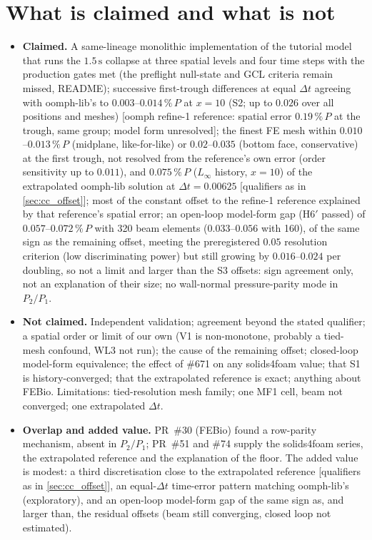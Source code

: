 \documentclass[sn-mathphys,Numbered]{sn-jnl}
\newcommand{\urefOne}{{\small[oomph refine-1 reference: spatial error $0.19\,\%\,P$ at the trough, same group; model form unresolved]}}
\newcommand{\uref}{{\small[qualifiers as in \ref{sec:cc_offset}]}}
\begin{document}
\section{What is claimed and what is not}\label{sec:cc_claims}
\begin{itemize}
\item \textbf{Claimed.} A same-lineage monolithic implementation of the tutorial model that runs the $1.5\,\mathrm s$ collapse at three spatial levels and four time steps with the production gates met (the preflight null-state and GCL criteria remain missed, README); successive first-trough differences at equal $\Delta t$ agreeing with oomph-lib's to $0.003$--$0.014\,\%\,P$ at $x=10$ (S2; up to $0.026$ over all positions and meshes) \urefOne; the finest FE mesh within $0.010$--$0.013\,\%\,P$ (midplane, like-for-like) or $0.02$--$0.035$ (bottom face, conservative) at the first trough, not resolved from the reference's own error (order sensitivity up to $0.011$), and $0.075\,\%\,P$ ($L_\infty$ history, $x=10$) of the extrapolated oomph-lib solution at $\Delta t=0.00625$ \uref; most of the constant offset to the refine-1 reference explained by that reference's spatial error; an open-loop model-form gap (H6$'$ passed) of $0.057$--$0.072\,\%\,P$ with 320 beam elements ($0.033$--$0.056$ with 160), of the same sign as the remaining offset, meeting the preregistered $0.05$ resolution criterion (low discriminating power) but still growing by $0.016$--$0.024$ per doubling, so not a limit and larger than the S3 offsets: sign agreement only, not an explanation of their size; no wall-normal pressure-parity mode in $P_2/P_1$.
\item \textbf{Not claimed.} Independent validation; agreement beyond the stated qualifier; a spatial order or limit of our own (V1 is non-monotone, probably a tied-mesh confound, WL3 not run); the cause of the remaining offset; closed-loop model-form equivalence; the effect of \#671 on any solids4foam value; that S1 is history-converged; that the extrapolated reference is exact; anything about FEBio. Limitations: tied-resolution mesh family; one MF1 cell, beam not converged; one extrapolated $\Delta t$.
\item \textbf{Overlap and added value.} PR~\#30 (FEBio) found a row-parity mechanism, absent in $P_2/P_1$; PR~\#51 and \#74 supply the solids4foam series, the extrapolated reference and the explanation of the floor. The added value is modest: a third discretisation close to the extrapolated reference \uref, an equal-$\Delta t$ time-error pattern matching oomph-lib's (exploratory), and an open-loop model-form gap of the same sign as, and larger than, the residual offsets (beam still converging, closed loop not estimated).
\end{itemize}
\end{document}
